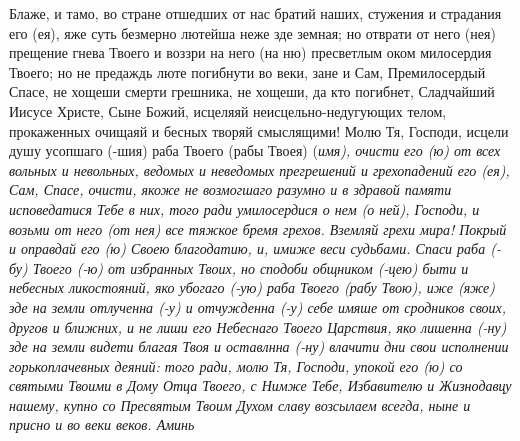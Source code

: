 Блаже, и тамо, во стране отшедших от нас братий наших, стужения и страдания его (ея), яже суть безмерно лютейша неже зде земная; но отврати от него (нея) прещение гнева Твоего и воззри на него (на ню) пресветлым оком милосердия Твоего; но не предаждь люте погибнути во веки, зане и Сам, Премилосердый Спасе, не хощеши смерти грешника, не хощеши, да кто погибнет, Сладчайший Иисусе Христе, Сыне Божий, исцеляяй неисцельно-недугующих телом, прокаженных очищаяй и бесных творяй смыслящими! Молю Тя, Господи, исцели душу усопшаго (-шия) раба Твоего (рабы Твоея) (\itshape имя\normalfont{}), очисти его (ю) от всех вольных и невольных, ведомых и неведомых прегрешений и грехопадений его (ея), Сам, Спасе, очисти, якоже не возмогшаго разумно и в здравой памяти исповедатися Тебе в них, того ради умилосердися о нем (о ней), Господи, и возьми от него (от нея) все тяжкое бремя грехов. Вземляй грехи мира! Покрый и оправдай его (ю) Своею благодатию, и, имиже веси судьбами. Спаси раба (-бу) Твоего (-ю) от избранных Твоих, но сподоби общником (-цею) быти и небесных ликостояний, яко убогаго (-ую) раба Твоего (рабу Твою), иже (яже) зде на земли отлученна (-у) и отчужденна (-у) себе имяше от сродников своих, другов и ближних, и не лиши его Небеснаго Твоего Царствия, яко лишенна (-ну) зде на земли видети благая Твоя и оставлнна (-ну) влачити дни свои исполнении горькоплачевных деяний: того ради, молю Тя, Господи, упокой его (ю) со святыми Твоими в Дому Отца Твоего, с Нимже Тебе, Избавителю и Жизнодавцу нашему, купно со Пресвятым Твоим Духом славу возсылаем всегда, ныне и присно и во веки веков. Аминь


\mychapterending




